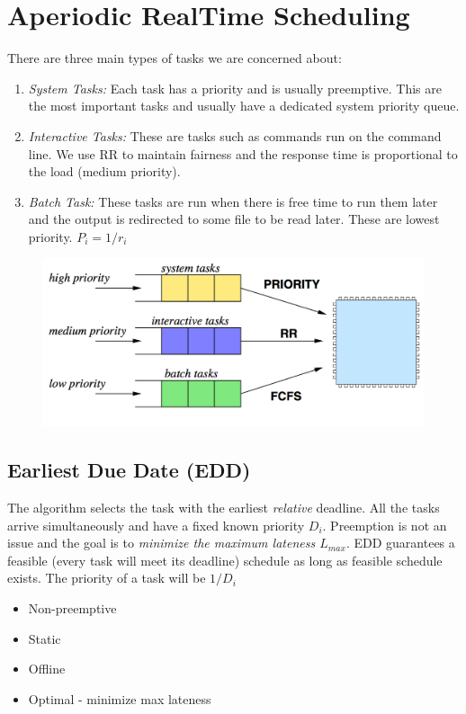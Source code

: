 \documentclass{hw}
\begin{document}
\section{Aperiodic Real\-Time Scheduling}
There are three main types of tasks we are concerned about:
\begin{enumerate}
  \item \emph{System Tasks:} Each task has a priority and is usually preemptive.
    This are the most important tasks and usually have a dedicated system 
    priority queue.
  \item \emph{Interactive Tasks:} These are tasks such as commands run on the 
    command line. We use RR to maintain fairness and the response time is 
    proportional to the load (medium priority).
  \item \emph{Batch Task:} These tasks are run when there is free time to run 
    them later and the output is redirected to some file to be read later. These
    are lowest priority. $P_{i} = 1/r_{i}$
\end{enumerate}
\begin{figure}[H]
  \centering
  \includegraphics[scale=.6]{tasks}
\end{figure}

\subsection{Earliest Due Date (EDD)}
The algorithm selects the task with the earliest \emph{relative} deadline. All
the tasks arrive simultaneously and have a fixed known priority $D_{i}$. 
Preemption is not an issue and the goal is to \emph{minimize the maximum 
lateness $L_{max}$}. EDD guarantees a feasible (every task will meet its deadline)
schedule as long as feasible schedule exists. The priority of a task will be 
$1/D_{i}$
\begin{itemize}
  \item Non-preemptive
  \item Static
  \item Offline
  \item Optimal - minimize max lateness
\end{itemize}
\end{document}
